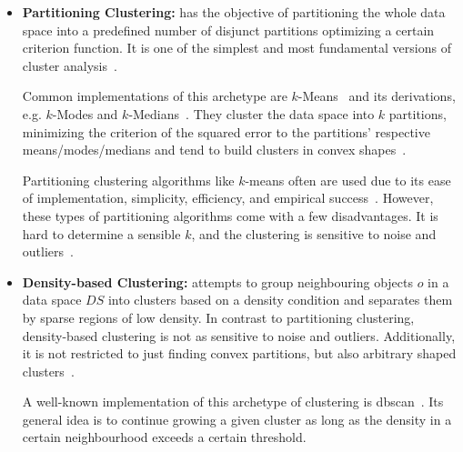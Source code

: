 \begin{itemize}
    \item \textbf{Partitioning Clustering:} has the objective of partitioning the whole data space into a predefined number of disjunct partitions optimizing a certain criterion function. It is one of the simplest and most fundamental versions of cluster analysis~\cite[Ch.10.2]{han2011data}.
    
    Common implementations of this archetype are $k$-Means~\cite{kmeansmacqueen1967some} and its derivations, e.g. $k$-Modes and $k$-Medians~\cite{kmeanshalfcenturysteinley2006k}. They cluster the data space into $k$ partitions, minimizing the criterion of the squared error to the partitions' respective means/modes/medians and tend to build clusters in convex shapes~\cite{clusteringsurveyberkhin2006survey}. 
    
    Partitioning clustering algorithms like $k$-means often are used due to its ease of implementation, simplicity, efficiency, and empirical success~\cite{kmeans50jain2010data}.
    However, these types of partitioning algorithms come with a few disadvantages. It is hard to determine a sensible $k$, and the clustering is sensitive to noise and outliers~\cite{dataclusteringreviewjain1999data}. 
    
    \item \textbf{Density-based Clustering:} attempts to group neighbouring objects $o$ in a data space $DS$ into clusters based on a density condition and separates them by sparse regions of low density. In contrast to partitioning clustering, density-based clustering is not as sensitive to noise and outliers. Additionally, it is not restricted to just finding convex partitions, but also arbitrary shaped clusters~\cite[Ch.10.4]{han2011data}.
    
    A well-known implementation of this archetype of clustering is \acrshort{dbscan}~\cite{DBSCANEKSX96}. Its general idea is to continue growing a given cluster as long as the density in a certain neighbourhood exceeds a certain threshold. 
    

\end{itemize}
